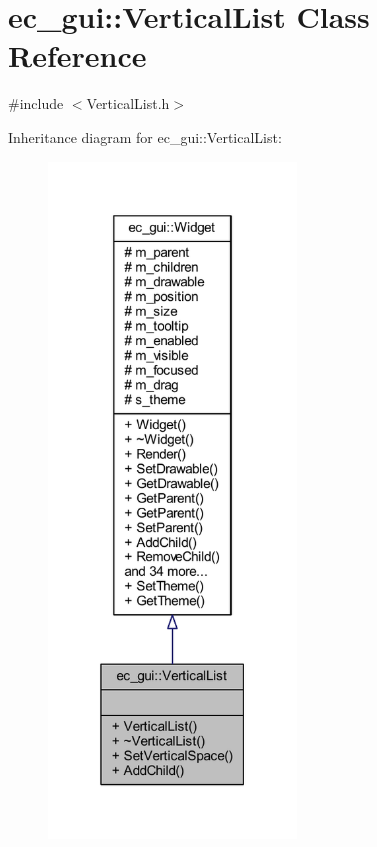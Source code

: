 \hypertarget{classec__gui_1_1_vertical_list}{}\section{ec\+\_\+gui\+:\+:Vertical\+List Class Reference}
\label{classec__gui_1_1_vertical_list}


{\ttfamily \#include $<$Vertical\+List.\+h$>$}



Inheritance diagram for ec\+\_\+gui\+:\+:Vertical\+List\+:\nopagebreak
\begin{figure}[H]
\begin{center}
\leavevmode
\includegraphics[width=187pt]{classec__gui_1_1_vertical_list__inherit__graph}
\end{center}
\end{figure}


